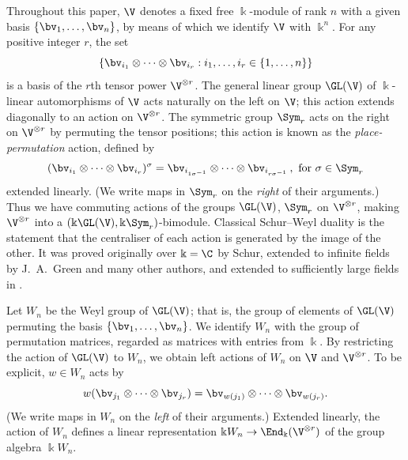 Throughout this paper, $\V$ denotes a fixed free $\Bbbk$-module of
rank $n$ with a given basis $\{\bv_1, \dots, \bv_n\}$, by means of which
we identify $\V$ with $\Bbbk^n$. For any positive integer $r$, the set
\begin{equation}\label{eq:TS-basis}
\{ \bv_{i_1} \otimes \cdots \otimes \bv_{i_r} :
 i_1,\dots, i_r \in \{ 1,
\dots, n\} \}
\end{equation}
is a basis of the $r$th tensor power $\V^{\otimes r}$. The general
linear group $\GL(\V)$ of $\Bbbk$-linear automorphisms of $\V$ acts
naturally on the left on $\V$; this action extends diagonally to an
action on $\V^{\otimes r}$. The symmetric group $\Sym_r$ acts on the
right on $\V^{\otimes r}$ by permuting the tensor positions; this
action is known as the \emph{place-permutation} action, defined by
\begin{equation}\label{eq:PP-action}
(\bv_{i_1} \otimes \cdots \otimes \bv_{i_r})^\sigma = \bv_{i_{1 \sigma^{-1}}}
\otimes \cdots \otimes \bv_{i_{r \sigma^{-1}}} \, , \text{ for } \sigma \in
\Sym_r
\end{equation}
extended linearly. (We write maps in $\Sym_r$ on the \emph{right} of
their arguments.) Thus we have commuting actions of the groups
$\GL(\V)$, $\Sym_r$ on $\V^{\otimes r}$, making $\V^{\otimes r}$ into
a $(\Bbbk \GL(\V), \Bbbk \Sym_r)$-bimodule. Classical Schur--Weyl
duality is the statement that the centraliser of each action is
generated by the image of the other. It was proved originally over
$\Bbbk = \C$ by Schur, extended to infinite fields by J.~A.~Green and
many other authors, and extended to sufficiently large fields in
\cite{Benson-Doty}.


Let $W_n$ be the Weyl group of $\GL(\V)$; that is, the group of elements
of $\GL(\V)$ permuting the basis $\{\bv_1, \dots, \bv_n\}$. We identify
$W_n$ with the group of permutation matrices, regarded as matrices
with entries from $\Bbbk$. By restricting the action of $\GL(\V)$ to
$W_n$, we obtain left actions of $W_n$ on $\V$ and $\V^{\otimes
 r}$. To be explicit, $w \in W_n$ acts by
\begin{equation}\label{eq:W_n-action}
 w (\bv_{j_1} \otimes \cdots \otimes \bv_{j_r}) = \bv_{w(j_1)} \otimes
 \cdots \otimes \bv_{w(j_r)}.
\end{equation}
(We write maps in $W_n$ on the \emph{left} of their arguments.)
Extended linearly, the action of $W_n$ defines a linear representation
$\Bbbk W_n \to \End_\Bbbk( \V^{\otimes r} )$ of the group algebra
$\Bbbk W_n$.

